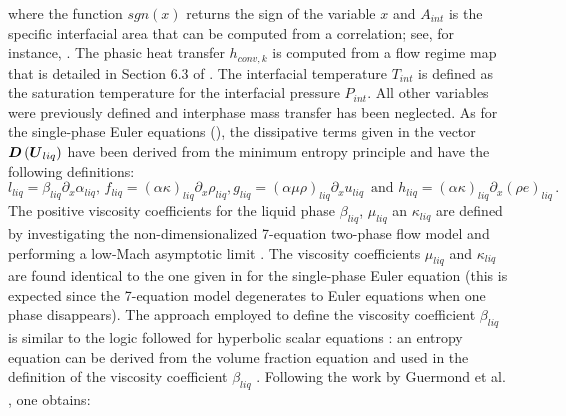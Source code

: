 \documentclass{inputs/mc2015}
\begin{document}
%
where the function $sgn(x)$ returns the sign of the variable $x$ and $A_{int}$ is the specific interfacial area that can be computed from a correlation; see, for instance, \cite{SEM}. The phasic heat transfer $h_{conv,k}$ is computed from a flow regime map that is detailed in Section 6.3 of \cite{Berry_Peterson_2014}. The interfacial temperature $T_{int}$ is defined as the saturation temperature for the interfacial pressure $P_{int}$. All other variables were previously defined and interphase mass transfer has been neglected. As for the single-phase Euler equations (), the dissipative terms given in the vector $\boldsymbol D\left( \boldsymbol U_{liq} \right)$ have been derived from the minimum entropy principle and have the following definitions:
%
\begin{subequations}
\begin{equation}
l_{liq} = \beta_{liq} \partial_x \alpha_{liq} , \, f_{liq}= ( \alpha \kappa )_{liq} \partial_x \rho_{liq} , 
\end{equation}
\begin{equation}
 g_{liq} = ( \alpha \mu \rho )_{liq} \partial_x u_{liq} \, \text{ and } h_{liq} = ( \alpha \kappa )_{liq} \partial_x \left( \rho e \right)_{liq} \, . 
\end{equation}
\end{subequations}
%
The positive viscosity coefficients for the liquid phase $\beta_{liq}$, $\mu_{liq}$ an $\kappa_{liq}$ are defined by investigating the non-dimensionalized 7-equation two-phase flow model and performing a low-Mach asymptotic limit \cite{Marco_paper_7_equ}. The viscosity coefficients $\mu_{liq}$ and $\kappa_{liq}$ are found identical to the one given in  for the single-phase Euler equation (this is expected since the 7-equation model degenerates to Euler equations when one phase disappears). The approach employed to define the viscosity coefficient $\beta_{liq}$ is similar to the logic followed for hyperbolic scalar equations \cite{jlg1, jlg2}: an entropy equation can be derived from the volume fraction equation and used in the definition of the viscosity coefficient $\beta_{liq}$ . Following the work by Guermond et al. \cite{jlg1, jlg2}, one obtains:
%
\end{document}
